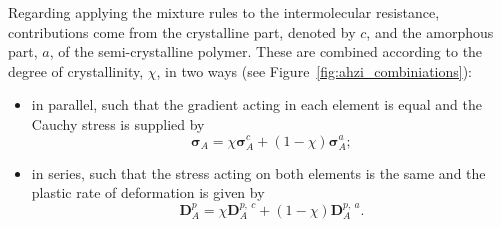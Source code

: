 Regarding applying the mixture rules to the intermolecular resistance, contributions come from the crystalline part, denoted by $c$, and the amorphous part, $a$, of the semi-crystalline polymer.
These are combined according to the degree of crystallinity, $\chi$, in two ways (see Figure~\ref{fig:ahzi_combiniations}):
\begin{itemize}
	\item in parallel, such that the gradient acting in each element is equal and the Cauchy stress is supplied by
	\begin{equation}
		\bm\sigma_A = \chi\bm\sigma_A^c + (1 -\chi)\bm\sigma_A^a;
	\end{equation}
	\item in series, such that the stress acting on both elements is the same and the plastic rate of deformation is given by
	\begin{equation}
		\bm D^p_A = \chi \bm D^{p,\ c}_A + (1 -\chi)\bm D^{p,\ a}_A.
	\end{equation}
\end{itemize}
